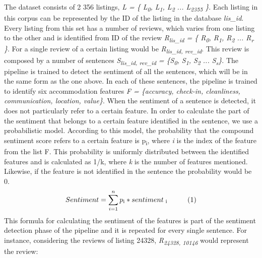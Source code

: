 The dataset consists of 2 356 listings, \textit{L = \{ L\textsubscript{0}, L\textsubscript{1},  L\textsubscript{2} ... L\textsubscript{2355} \}}. Each listing in this corpus can be represented by the ID of the listing in the database \textit{lis\_id}. Every listing from this set has a number of reviews, which varies from one listing to the other and is identified from ID of the review \textit{R\textsubscript{lis\_id} = \{ R\textsubscript{0}, R\textsubscript{1},  R\textsubscript{2} ... R\textsubscript{r} \}}. For a single review of a certain listing would be \textit{R\textsubscript{lis\_id, rev\_id}}. This review is composed by a number of sentences \textit{S\textsubscript{lis\_id, rev\_id} = \{S\textsubscript{0}, S\textsubscript{1}, S\textsubscript{2} ... S\textsubscript{s}\}}. 
The pipeline is trained to detect the sentiment of all the sentences, which will be in the same form as the one above. 
In each of these sentences, the pipeline is trained to identify six accommodation features \textit{F = \{accuracy, check-in, cleanliness, communication, location, value\}}. When the sentiment of a sentence is detected, it does not particularly refer to a certain feature. In order to calculate the part of the sentiment that belongs to a certain feature identified in the sentence, we use a probabilistic model. According to this model, the probability that the compound sentiment score refers to a certain feature is p\textsubscript{i}, where \textit{i} is the index of the feature from the list F. This probability is uniformly distributed between the identified features and is calculated as 1/k, where \textit{k} is the number of features mentioned. Likewise, if the feature is not identified in the sentence the probability would be 0.
%
$$Sentiment = \sum_{i=1}^{n}p\textsubscript{i} *  sentiment\textsubscript{ i} \hspace{1cm} (1)$$ 
%
This formula for calculating the sentiment of the features is part of the sentiment detection phase of the pipeline and it is repeated for every single sentence. For instance, considering the reviews of listing 24328,  \textit{R\textsubscript{24328, 10146}} would represent the review:
